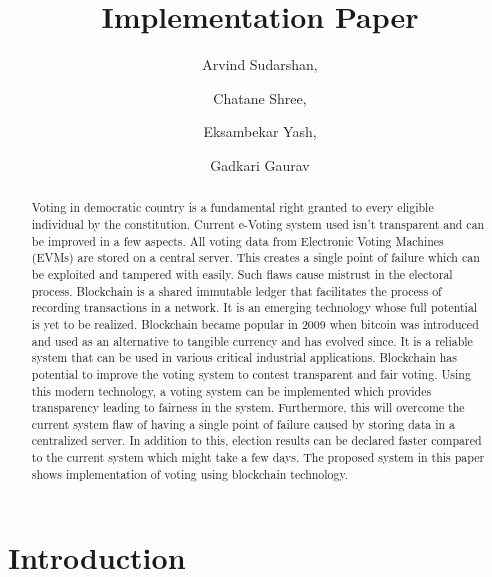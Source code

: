 \documentclass[journal,onecolumn]{IEEEtran}
\title{Implementation Paper}
\author{
  Arvind Sudarshan,
  \and
  Chatane Shree,
  \and
  Eksambekar Yash,
  \and
  Gadkari Gaurav
}
\begin{document}
  \maketitle

  \begin{abstract}
    Voting in democratic country is a fundamental right granted to every eligible individual by the constitution. Current e-Voting system used isn’t transparent and can be improved in a few aspects. All voting data from Electronic Voting Machines (EVMs) are stored on a central server. This creates a single point of failure which can be exploited and tampered with easily. Such flaws cause mistrust in the electoral process. Blockchain is a shared  immutable ledger that facilitates the process of recording transactions in a network. It is an emerging technology whose full potential is yet to be realized. Blockchain became popular in 2009 when bitcoin was introduced and used as an alternative to tangible currency and has evolved since. It is a reliable system that can be used in various critical industrial applications. Blockchain has potential to improve the voting system to contest transparent and fair voting. Using this modern technology, a voting system can be implemented which provides transparency leading to fairness in the system. Furthermore, this will overcome the current system flaw of having a single point of failure caused by storing data in a centralized server. In addition to this, election results can be declared faster compared to the current system which might take a few days. The proposed system in this paper shows implementation of voting using blockchain technology.
  \end{abstract}
  \begin{IEEEkeywords}
  \end{IEEEkeywords}

  \section{Introduction}
\end{document}
